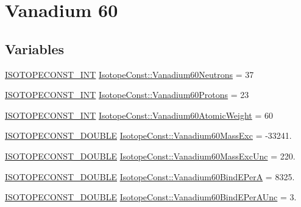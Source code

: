 \hypertarget{group___isotope_const-_vanadium-_v60}{}\section{Vanadium 60}
\label{group___isotope_const-_vanadium-_v60}
\subsection*{Variables}
\begin{DoxyCompactItemize}
\item 
\mbox{\hyperlink{group___isotope_const-_macros_ga5f18360b3e99483a35c32d789e62621c}{I\+S\+O\+T\+O\+P\+E\+C\+O\+N\+S\+T\+\_\+\+I\+NT}} \mbox{\hyperlink{group___isotope_const-_vanadium-_v60_gaf02b595494eb69b8e1926a0901223bf0}{Isotope\+Const\+::\+Vanadium60\+Neutrons}} = 37
\item 
\mbox{\hyperlink{group___isotope_const-_macros_ga5f18360b3e99483a35c32d789e62621c}{I\+S\+O\+T\+O\+P\+E\+C\+O\+N\+S\+T\+\_\+\+I\+NT}} \mbox{\hyperlink{group___isotope_const-_vanadium-_v60_gaf04b48f5d783cfea1de9f5006dd292c0}{Isotope\+Const\+::\+Vanadium60\+Protons}} = 23
\item 
\mbox{\hyperlink{group___isotope_const-_macros_ga5f18360b3e99483a35c32d789e62621c}{I\+S\+O\+T\+O\+P\+E\+C\+O\+N\+S\+T\+\_\+\+I\+NT}} \mbox{\hyperlink{group___isotope_const-_vanadium-_v60_ga76a3bbf52e39be9dca187654c4817d3a}{Isotope\+Const\+::\+Vanadium60\+Atomic\+Weight}} = 60
\item 
\mbox{\hyperlink{group___isotope_const-_macros_ga8f45a7272ce02c0b4c65c44636ed719a}{I\+S\+O\+T\+O\+P\+E\+C\+O\+N\+S\+T\+\_\+\+D\+O\+U\+B\+LE}} \mbox{\hyperlink{group___isotope_const-_vanadium-_v60_ga00c4123236ed80ec78ab6f7b09ff7c25}{Isotope\+Const\+::\+Vanadium60\+Mass\+Exc}} = -\/33241.
\item 
\mbox{\hyperlink{group___isotope_const-_macros_ga8f45a7272ce02c0b4c65c44636ed719a}{I\+S\+O\+T\+O\+P\+E\+C\+O\+N\+S\+T\+\_\+\+D\+O\+U\+B\+LE}} \mbox{\hyperlink{group___isotope_const-_vanadium-_v60_ga6a0e19ae9041aeba5d335e266a1478ae}{Isotope\+Const\+::\+Vanadium60\+Mass\+Exc\+Unc}} = 220.
\item 
\mbox{\hyperlink{group___isotope_const-_macros_ga8f45a7272ce02c0b4c65c44636ed719a}{I\+S\+O\+T\+O\+P\+E\+C\+O\+N\+S\+T\+\_\+\+D\+O\+U\+B\+LE}} \mbox{\hyperlink{group___isotope_const-_vanadium-_v60_ga1792cbf0206889360ec1e36e35b4244e}{Isotope\+Const\+::\+Vanadium60\+Bind\+E\+PerA}} = 8325.
\item 
\mbox{\hyperlink{group___isotope_const-_macros_ga8f45a7272ce02c0b4c65c44636ed719a}{I\+S\+O\+T\+O\+P\+E\+C\+O\+N\+S\+T\+\_\+\+D\+O\+U\+B\+LE}} \mbox{\hyperlink{group___isotope_const-_vanadium-_v60_gabee632092ac872a820ac4b4ffff67e2c}{Isotope\+Const\+::\+Vanadium60\+Bind\+E\+Per\+A\+Unc}} = 3.

\end{DoxyCompactItemize}
